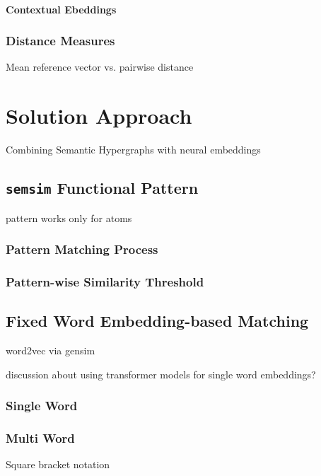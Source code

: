\documentclass[11pt]{scrreprt}
\begin{document}
\subsubsection{Contextual Ebeddings}


\subsection{Distance Measures}

Mean reference vector vs. pairwise distance




\chapter{Solution Approach}

Combining Semantic Hypergraphs with neural embeddings

\section{\texttt{semsim} Functional Pattern}
pattern works only for atoms


\subsection{Pattern Matching Process}

\subsection{Pattern-wise Similarity Threshold}


\section{Fixed Word Embedding-based Matching}
word2vec via gensim

discussion about using transformer models for single word embeddings?

\subsection{Single Word}

\subsection{Multi Word}
\label{sec:semsim-multi-word}
Square bracket notation 
\end{document}

